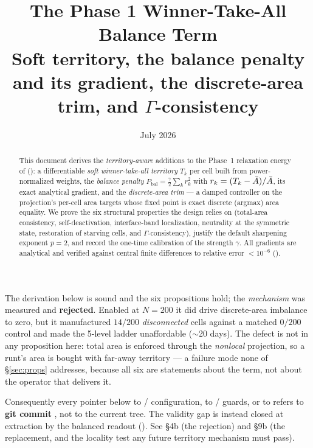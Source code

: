 \documentclass[11pt,a4paper]{article}
\title{\textbf{The Phase 1 Winner-Take-All Balance Term}\\[0.5em]
  \large Soft territory, the balance penalty and its gradient,
  the discrete-area trim, and $\Gamma$-consistency}
\author{}
\date{July 2026}
\begin{document}
\maketitle

\begin{abstract}
This document derives the \emph{territory-aware} additions to the Phase~1
relaxation energy of 
(): a differentiable
\emph{soft winner-take-all territory} $T_k$ per cell built from
power-normalized weights, the \emph{balance penalty}
$P_{\mathrm{bal}} = \tfrac{\gamma}{2}\sum_k r_k^2$ with
$r_k = (T_k-\bar{A})/\bar{A}$, its exact analytical gradient, and the
\emph{discrete-area trim} — a damped controller on the projection's per-cell
area targets whose fixed point is exact discrete (argmax) area equality. We
prove the six structural properties the design relies on (total-area
consistency, self-deactivation, interface-band localization, neutrality at the
symmetric state, restoration of starving cells, and $\Gamma$-consistency),
justify the default sharpening exponent $p=2$, and record the one-time
calibration of the strength $\gamma$. All gradients are analytical and
verified against central finite differences to relative error
$<10^{-6}$ ().
\end{abstract}

\begin{tcolorbox}[colback=red!5!white, colframe=red!60!black,
                  title={Not adopted --- the code this document derives was
                  removed from \code{main} on 2026-08-10},
                  fontupper=\small]
The derivation below is sound and the six propositions hold; the
\emph{mechanism} was measured and \textbf{rejected}. Enabled at $N{=}200$ it did
drive discrete-area imbalance to zero, but it manufactured $14/200$
\emph{disconnected} cells against a matched $0/200$ control and made the
5-level ladder unaffordable ($\sim$20 days). The defect is not in any
proposition here: total area is enforced through the \emph{nonlocal}
projection, so a runt's area is bought with far-away territory --- a failure
mode none of \S\ref{sec:props} addresses, because all six are statements about
the term, not about the operator that delivers it.

Consequently every  pointer below to
 /  configuration, to
/ guards, or to
 refers to
\textbf{git commit }, not to the current tree. The validity gap
is instead closed at extraction by the balanced readout
(). See
 \S4b (the
rejection) and \S9b (the replacement, and the locality test any future
territory mechanism must pass).
\end{tcolorbox}
\end{document}
